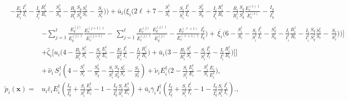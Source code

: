\documentclass[a4paper]{article}
\newcommand{\dsum}{\displaystyle\sum}
\begin{document}
\begin{align}
& - \frac{E_i}{E^\dagger_i}\frac{I^\dagger_i}{I_i} - \frac{I_i}{I^\dagger_i}\frac{R^\dagger_i}{R_i}  -\frac{S^\dagger _q}{S_q}-\frac{R_i}{R^\dagger _i}\frac{S_q}{S^\dagger _q}\frac{S^\dagger _r}{S_r}-\,\frac{S_r}{S^\dagger _r}\Big)\Big) + \bar u_i\Big(\xi_i\Big(2\ell+7 -\frac{S^\dagger _i}{S_i}-\frac{S_i}{S^\dagger _i} \frac{I^\dagger_i}{I_i}  -\frac{S^\dagger _q}{S_q} - \frac{I_i}{I^\dagger_i}\frac{R^\dagger_i}{R_i} - \frac{R_i}{R^\dagger _i}\frac{S_q}{S^\dagger _q}\frac{E^{(1)\dagger }_r}{E^{(1)}_r}-\frac{I_q}{I^\dagger _q}\nonumber\end{align}
\begin{align}  \nonumber\\
&- {\dsum_{j=1}^{\ell}}\frac{E^{(j)}_q}{E^{(j)\dagger }_q}\frac{E^{(j+1)\dagger }_r}{E^{(j+1)}_r}-\, {\dsum_{j=1}^{\ell}}\frac{ E^{(j)}_r}{ E^{(j)\dagger }_r}\frac{E^{(j)\dagger }_q}{E^{(j)}_q} -\frac{E^{(\ell+1)}_r}{E^{(\ell+1)\dagger }_r}\frac{I^\dagger _q}{I_q}  \Big) + \,\overline{\xi_i}\Big(6 - \frac{S^\dagger _i}{S_i} -\frac{S_i}{S^\dagger _i}\frac{I^\dagger_i}{I_i} -\frac{S^\dagger _q}{S_q} - \frac{I_i}{I^\dagger_i}\frac{R^\dagger_i}{R_i}-\frac{I_i}{I^\dagger _i}\frac{S_q}{S^\dagger _q}\frac{S^\dagger _r}{S_r}-\,\frac{S_r}{S^\dagger _r}\Big)\Big)\Big]\nonumber\\&  + \hat\zeta_i\Big[u_i\Big(4  - \frac{R_i}{R^\dagger _i} \frac{S^\dagger _i}{S_i} - \frac{S_i}{S^\dagger_i}\frac{E^\dagger_i}{E_i} - \frac{E_i}{E^\dagger_i}\frac{I^\dagger_i}{I_i} - \frac{I_i}{I^\dagger_i}\frac{R^\dagger_i}{R_i} \Big) + \bar u_i\Big(3  - \frac{R_i}{R^\dagger _i} \frac{S^\dagger _i}{S_i} - \frac{S_i}{S^\dagger_i}\frac{I^\dagger_i}{I_i}  - \frac{I_i}{I^\dagger_i}\frac{R^\dagger_i}{R_i} \Big)\Big] \Bigg] \nonumber\\& +\,\hat\nu_i\,S_i^\dagger  \left( 4-\frac{S^\dagger _i}{S_i} - \frac{S^\dagger _q}{S_q}-\frac{S_i}{S^\dagger _i}\frac{S_q}{S^\dagger _q}\frac{S^\dagger _r}{S_r}-\frac{S_r}{S^\dagger _r}\right) + \widetilde\nu_iE^\dagger_i\Big(2-\frac{S_i}{S^\dagger_i}\frac{E^\dagger_i}{E_i} - \frac{S^\dagger_i}{S_i} \frac{E_i}{E^\dagger_i}\Big),\\
\widetilde p_{i}(\mathbf x)=& u_i\bar\varepsilon_iE^\dagger _i\left(\frac{I_q}{I^\dagger _q} +  \frac{S_i}{S^\dagger_i} \frac{E^\dagger_i}{E_i}-1 - \frac{I_q}{I^\dagger _q} \frac{S_i}{S^\dagger _i}\frac{E^\dagger _i}{E_i}\right) + \bar u_i \bar\gamma_iI^\dagger _i\left(\frac{I_q}{I^\dagger _q} +  \frac{S_i}{S^\dagger_i} \frac{I^\dagger_i}{I_i}-1 - \frac{I_q}{I^\dagger _q} \frac{S_i}{S^\dagger _i}\frac{I^\dagger _i}{I_i}\right).,\label{eq:frgmtliap22}
\end{align}
\end{document}
